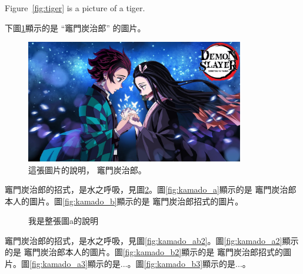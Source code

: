 Figure~\ref{fig:tiger} is a picture of a tiger.





下圖\ref{fig:kamado}顯示的是 ``竈門炭治郎'' 的圖片。

\begin{figure}[h!]
    \centering
    \includegraphics[width=0.85\textwidth]{fig/kamado/maxresdefault.jpg}
    \caption{這張圖片的說明， 竈門炭治郎。}
    \label{fig:kamado}
\end{figure}


竈門炭治郎的招式，是水之呼吸，見圖\ref{fig:kamado_ab}。圖\ref{fig:kamado_a}顯示的是 竈門炭治郎本人的圖片。圖\ref{fig:kamado_b}顯示的是 竈門炭治郎招式的圖片。


\begin{figure}[htbp]
\centering
{}
\caption{我是整張圖a的說明}
\label{fig:kamado_ab}
\end{figure}



竈門炭治郎的招式，是水之呼吸，見圖\ref{fig:kamado_ab2}。圖\ref{fig:kamado_a2}顯示的是 竈門炭治郎本人的圖片。圖\ref{fig:kamado_b2}顯示的是 竈門炭治郎招式的圖片。圖\ref{fig:kamado_a3}顯示的是...。圖\ref{fig:kamado_b3}顯示的是...。



